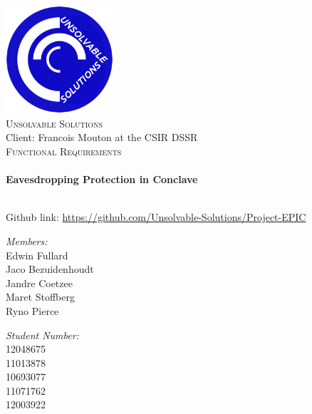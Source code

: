 
\begin{titlepage}
\begin{center}
\includegraphics[width = 0.3\textwidth]{US_newLogo.png}~\\[1cm]
\textsc{\LARGE Unsolvable Solutions}\\
Client: Francois Mouton at the CSIR DSSR\\[1.5cm]
\textsc{\Large  Functional Requirements}\\[0.5cm]

 \HRule\\[0.4cm]
{ \huge \bfseries  Eavesdropping Protection in Conclave \\[0.4cm] }

 \HRule\\ 



Github link:  \url{https://github.com/Unsolvable-Solutions/Project-EPIC} \\[1.2cm]

\noindent
\begin{minipage}[t]{0.4\textwidth}

	\begin{flushleft} \large
	\emph{Members:}\\
		Edwin Fullard  \\
		Jaco Bezuidenhoudt \\
		Jandre Coetzee\\
		Maret Stoffberg\\
		Ryno Pierce\\
	\end{flushleft}
\end{minipage}%
\begin{minipage}[t]{0.4\textwidth}
\begin{flushright} \large
	\emph{Student Number:} \\
		12048675 \\
		11013878 \\
		10693077 \\
		11071762 \\
	    12003922\\
	\end{flushright}
\end{minipage}

\vfill






\end{center}
\end{titlepage}
